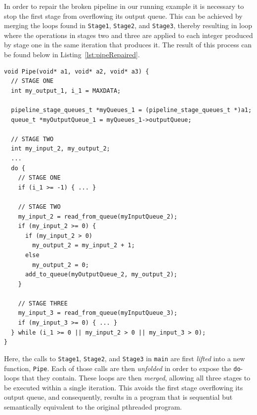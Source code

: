 In order to repair the broken pipeline in our running example it is necessary to stop the first stage from overflowing its output queue. This can be achieved by merging the loops found in \lstinline|Stage1|, \lstinline|Stage2|, and \lstinline|Stage3|, thereby resulting in loop where the operations in stages two and three are applied to each integer produced by stage one in the same iteration that produces it. The result of this process can be found below in Listing~\ref{lst:pipeRepaired}.



\begin{lstlisting}[caption=Simple Pipeline Code after Code Repair, frame=single, label=lst:pipeRepaired]
void Pipe(void* a1, void* a2, void* a3) {
  // STAGE ONE
  int my_output_1, i_1 = MAXDATA;
  
  pipeline_stage_queues_t *myQueues_1 = (pipeline_stage_queues_t *)a1;
  queue_t *myOutputQueue_1 = myQueues_1->outputQueue;

  // STAGE TWO
  int my_input_2, my_output_2;
  ...
  do {
    // STAGE ONE
    if (i_1 >= -1) { ... }

    // STAGE TWO
    my_input_2 = read_from_queue(myInputQueue_2);
    if (my_input_2 >= 0) {
      if (my_input_2 > 0)
        my_output_2 = my_input_2 + 1;
      else
        my_output_2 = 0;
      add_to_queue(myOutputQueue_2, my_output_2);
    }

    // STAGE THREE
    my_input_3 = read_from_queue(myInputQueue_3);
    if (my_input_3 >= 0) { ... }
  } while (i_1 >= 0 || my_input_2 > 0 || my_input_3 > 0);
}
\end{lstlisting}

\noindent 
Here, the calls to \lstinline|Stage1|, \lstinline|Stage2|, and \lstinline|Stage3| in \lstinline|main| are first \emph{lifted} into a new function, \lstinline|Pipe|. Each of those calls are then \emph{unfolded} in order to expose the \lstinline|do|-loops that they contain. These loops are then \emph{merged}, allowing all three stages to be executed within a single iteration. This avoids the first stage overflowing its output queue, and consequently, results in a program that is sequential but semantically equivalent to the original pthreaded program.



